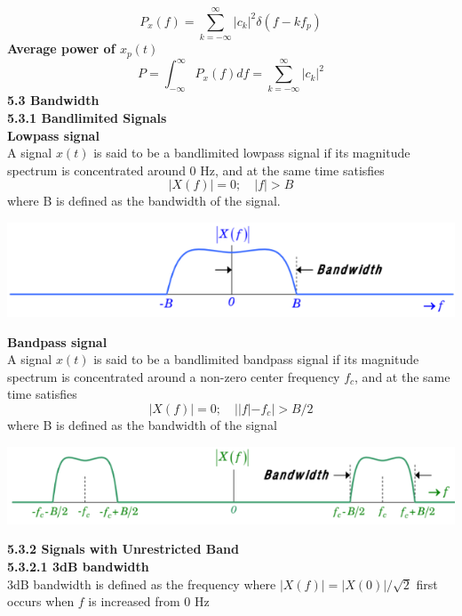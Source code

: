 \documentclass[6pt,landscape,a4paper]{extarticle}
\newenvironment{Figure}
  {\par\medskip\noindent\minipage{\linewidth}}
  {\endminipage\par\medskip}
\begin{document}
\begin{multicols*}{5}
    \[
        P_x(f)=\sum_{k=-\infty}^{\infty}|c_k|^2\delta (f-kf_p) \tag{5.12}
    \]
    \textbf{Average power of $x_p(t)$}
    \[
        P=\int_{-\infty}^{\infty}P_x(f)df=\sum_{k=-\infty}^{\infty}|c_k|^2 \tag{5.13}
    \]
    \textbf{5.3 Bandwidth}\\
    \textbf{5.3.1 Bandlimited Signals}\\
    \textbf{Lowpass signal}\\
    A signal $x(t)$ is said to be a bandlimited lowpass signal if its magnitude spectrum is concentrated around 0 Hz, and at the same time satisfies
    \[
        |X(f)|=0; \quad |f| > B \tag{5.14}
    \]
    where B is defined as the bandwidth of the signal. 
    \begin{Figure}
        \centering
        \includegraphics[width=\linewidth]{images/bandlimitedLowpassSignal.png}
    \end{Figure}
    \textbf{Bandpass signal}\\
    A signal $x(t)$ is said to be a bandlimited bandpass signal if its magnitude spectrum is concentrated around a non-zero center frequency $f_c$, and at the same time satisfies \[
        |X(f)|=0; \quad ||f|-f_c|>B/2 \tag{5.15}
    \]
    where B is defined as the bandwidth of the signal
    \begin{Figure}
        \centering
        \includegraphics[width=\linewidth]{images/bandlimitedBandpassSignal.png}
    \end{Figure}
    \textbf{5.3.2 Signals with Unrestricted Band}\\
    \textbf{5.3.2.1 3dB bandwidth}\\
    3dB bandwidth is defined as the frequency where $|X(f)|=|X(0)|/\sqrt{2}$ first occurs when $f$ is increased from 0 Hz
\end{multicols*}
\end{document}
